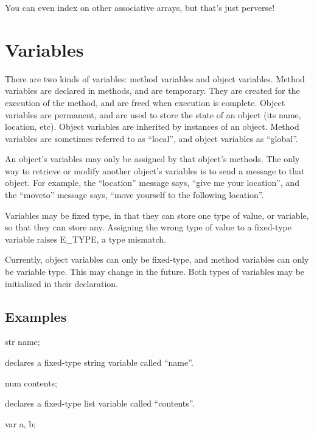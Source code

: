You can even index on other associative arrays, but that's just perverse!

\section{Variables}

There are two kinds of variables:  method variables and object variables.
Method variables are declared in methods, and are temporary.  They are
created for the execution of the method, and are freed when execution
is complete.  Object variables are permanent, and are used to store
the state of an object (its name, location, etc).  Object variables
are inherited by instances of an object.  Method variables are sometimes
referred to as ``local'', and object variables as ``global''.

An object's variables may only be assigned by that object's methods.
The only way to retrieve or modify another object's variables is to
send a message to that object.  For example, the ``location'' message
says, ``give me your location'', and the ``moveto'' message says, ``move
yourself to the following location''.

Variables may be fixed type, in that they can store one type of
value, or variable, so that they can store any.  Assigning the wrong
type of value to a fixed-type variable raises {\error E\_TYPE}, a type
mismatch.

Currently, object variables can only be fixed-type, and method variables
can only be variable type.  This may change in the future.  Both types of
variables may be initialized in their declaration.

\subsection{Examples}

\begin{code}
str name;
\end{code}

declares a fixed-type string variable called ``name''.

\begin{code}
num contents;
\end{code}
    
declares a fixed-type list variable called ``contents''.

\begin{code}
var a, b;
\end{code}

